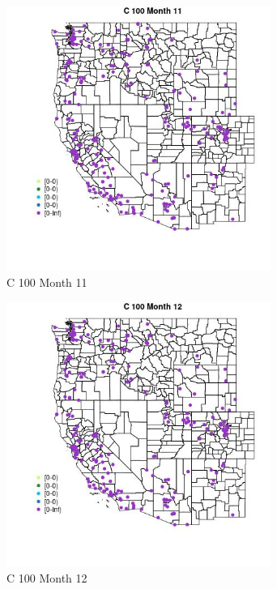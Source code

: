 \begin{figure} 
\centering  
\includegraphics[width=0.77\textwidth]{Code_Outputs/Report_ML_input_PM25_Step4_part_e_de_duplicated_aveswNAs_MapObsMo11C_100.jpg} 
\caption{\label{fig:Report_ML_input_PM25_Step4_part_e_de_duplicated_aveswNAsMapObsMo11C_100}C 100 Month 11} 
\end{figure} 
 

\begin{figure} 
\centering  
\includegraphics[width=0.77\textwidth]{Code_Outputs/Report_ML_input_PM25_Step4_part_e_de_duplicated_aveswNAs_MapObsMo12C_100.jpg} 
\caption{\label{fig:Report_ML_input_PM25_Step4_part_e_de_duplicated_aveswNAsMapObsMo12C_100}C 100 Month 12} 
\end{figure} 
 

